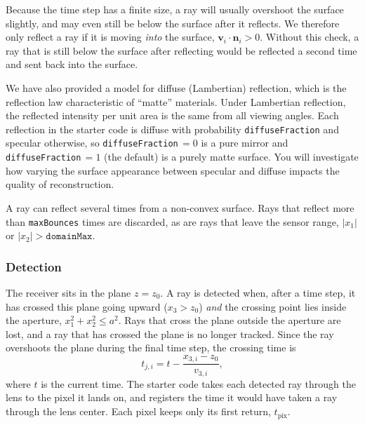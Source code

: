 \documentclass[../../me144_244_student.tex]{subfiles}
\begin{document}
Because the time step has a finite size, a ray will usually overshoot the surface slightly, and may
even still be below the surface after it reflects. We therefore only reflect a ray if it is moving
\emph{into} the surface, $\boldsymbol{v}_i \cdot \boldsymbol{n}_i > 0$. Without this check, a ray that
is still below the surface after reflecting would be reflected a second time and sent back into the
surface.

We have also provided a model for diffuse (Lambertian) reflection, which is the reflection law
characteristic of ``matte'' materials. Under Lambertian reflection, the reflected intensity per unit
area is the same from all viewing angles. Each reflection in the starter code is diffuse with
probability \texttt{diffuseFraction} and specular otherwise, so \texttt{diffuseFraction}\,$=0$ is a
pure mirror and \texttt{diffuseFraction}\,$=1$ (the default) is a purely matte surface. You will
investigate how varying the surface appearance between specular and diffuse impacts the quality of
reconstruction.

A ray can reflect several times from a non-convex surface. Rays that reflect more than
\texttt{maxBounces} times are discarded, as are rays that leave the sensor range, $|x_1|$ or $|x_2| >
\texttt{domainMax}$.

\subsubsection*{Detection}
The receiver sits in the plane $z = z_0$. A ray is detected when, after a time step, it has crossed this
plane going upward ($x_3 > z_0$) \emph{and} the crossing point lies inside the aperture,
$x_1^2 + x_2^2 \le a^2$. Rays that cross the plane outside the aperture are lost, and a ray that has
crossed the plane is no longer tracked. Since the ray overshoots the plane during the final time step,
the crossing time is
\begin{equation}
    t_{j,i} = t - \frac{x_{3,i} - z_0}{v_{3,i}},
\end{equation}
where $t$ is the current time. The starter code takes each detected ray through the lens to the pixel
it lands on, and registers the time it would have taken a ray through the lens center. Each pixel keeps
only its first return, $t_{\text{pix}}$.
\end{document}
